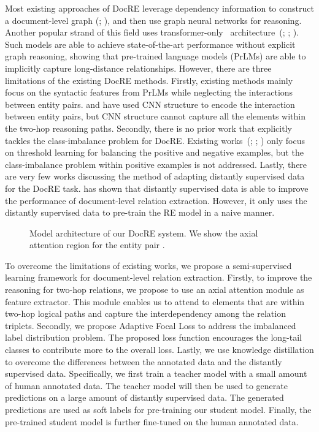 \documentclass[11pt]{article}
\begin{document}
Most existing approaches of DocRE leverage dependency information to construct a document-level graph (\citealp{zeng2021sire}; \citealp{zeng2020double}), and then use graph neural networks for reasoning. Another popular strand of this field uses transformer-only~\citep{vaswani2017attention} architecture~(\citealp{zhou2021document}; \citealp{xu2021entity}; \citealp{zhang2021document}). Such models are able to achieve state-of-the-art performance without explicit graph reasoning, showing that pre-trained language models (PrLMs) are able to implicitly capture long-distance relationships.  However, there are three limitations of the existing DocRE methods. Firstly, existing methods mainly focus on the syntactic features from PrLMs while neglecting the interactions between entity pairs. \citet{zhang2021document} and \citet{li2021mrn} have used CNN structure to encode the interaction between entity pairs, but CNN structure cannot capture all the elements within the two-hop reasoning paths. Secondly, there is no prior work that explicitly tackles the class-imbalance problem for DocRE. Existing works~(\citealp{zhou2021document}; \citealp{zhang2021document}; \citealp{zeng2020double}) only focus on threshold learning for balancing the positive and negative examples, but the class-imbalance problem within positive examples is not addressed. Lastly, there are very few works discussing the method of adapting distantly supervised data for the DocRE task. \citet{xu2021entity} has shown that distantly supervised data is able to improve the performance of document-level relation extraction. However, it only uses the distantly supervised data to pre-train the RE model in a naive manner.
\begin{figure*}
    \centering
    \setlength{\abovecaptionskip}{0pt} 
    \captionsetup{margin=2.5em}
    \caption{Model architecture of our DocRE system. We show the axial attention region for the entity pair .}
    \label{fig:model-architecture}
    
\end{figure*}


To overcome the limitations of existing works, we propose a semi-supervised learning framework for document-level relation extraction. Firstly, to improve the reasoning for two-hop relations, we propose to use an axial attention module as feature extractor. This module enables us to attend to elements that are within two-hop logical paths and capture the interdependency among the relation triplets. Secondly, we propose Adaptive Focal Loss to address the imbalanced label distribution problem. The proposed loss function encourages the long-tail classes to contribute more to the overall loss. Lastly, we use knowledge distillation to overcome the differences between the annotated data and the distantly supervised data. Specifically, we first train a teacher model with a small amount of human annotated data. The teacher model will then be used to generate predictions on a large amount of distantly supervised data. The generated predictions are used as soft labels for pre-training our student model. Finally, the pre-trained student model is further fine-tuned on the human annotated data.
\end{document}
